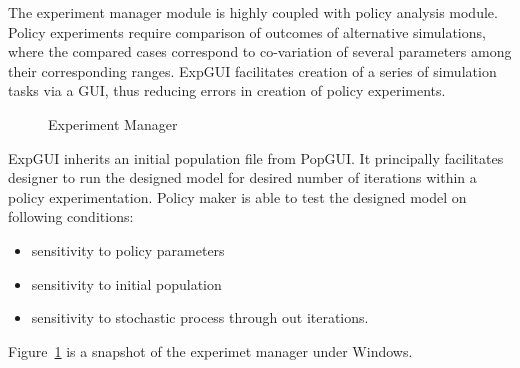The experiment manager module is highly coupled with policy analysis module. Policy experiments require comparison of outcomes of alternative simulations, where the compared cases correspond to co-variation of several parameters among their corresponding ranges. ExpGUI facilitates creation of a series of simulation tasks via a GUI, thus reducing errors in creation of policy experiments.

\begin{figure}[h]
  \centering
{}
  \caption{Experiment Manager}
  \label{figure:expgui}
\end{figure}

ExpGUI inherits an initial population file from PopGUI. It principally facilitates designer to run the designed model for desired number of iterations within a policy experimentation. Policy maker is able to test the designed model on following conditions:
\begin{itemize}
\item sensitivity to policy parameters
\item sensitivity to initial population
\item sensitivity to stochastic process through out iterations.
\end{itemize}

Figure~\ref{figure:expgui} is a snapshot of the experimet manager under Windows.
 


